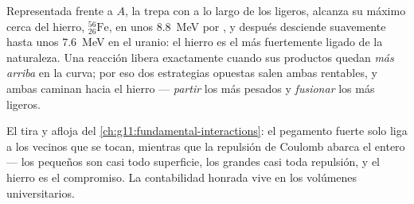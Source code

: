 \begin{proposition}\label{prop:g12:nuclear-energy:ironpeak}
Representada frente a $A$, la  trepa con  a lo
largo de los  ligeros, alcanza su máximo cerca del hierro,
${}^{56}_{26}\mathrm{Fe}$, en unos \qty{8.8}{MeV} por , y después desciende
suavemente hasta unos \qty{7.6}{MeV} en el uranio: el hierro es el  más
fuertemente ligado de la naturaleza. Una reacción libera  exactamente cuando
sus productos quedan \emph{más arriba} en la curva; por eso dos estrategias opuestas
salen ambas rentables, y ambas caminan hacia el hierro --- \emph{partir} los 
más pesados y \emph{fusionar} los más ligeros.
\end{proposition}
\admitted

\begin{remark}\label{rem:g12:nuclear-energy:whypeak}
El tira y afloja del \cref{ch:g11:fundamental-interactions}: el pegamento fuerte solo
liga a los vecinos que se tocan, mientras que la repulsión de Coulomb abarca el 
entero --- los  pequeños son casi todo superficie, los grandes casi toda
repulsión, y el hierro es el compromiso. La contabilidad honrada vive en los volúmenes
universitarios.
\end{remark}

